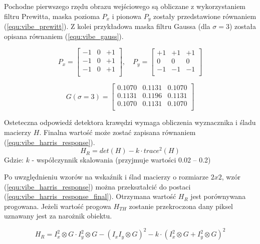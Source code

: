 Pochodne pierwszego rzędu obrazu wejściowego są obliczane z wykorzystaniem filtru Prewitta, maska pozioma $P_x$ i pionowa $P_y$ zostały przedstawione równaniem (\ref{equ:vibe_prewitt}). Z kolei przykładowa maska filtru Gaussa (dla $\sigma = 3$) została opisana równaniem (\ref{equ:vibe_gauss}).

    \begin{equation}
        P_x = \begin{bmatrix}
			    -1 & 0 & +1 \\
			    -1 & 0 & +1 \\
			    -1 & 0 & +1 \\
		    \end{bmatrix}
		,\quad 
		P_y= \begin{bmatrix}
			    +1 & +1 & +1 \\
			    0 & 0 & 0 \\
			    -1 & -1 & -1 \\
		    \end{bmatrix}
        \label{equ:vibe_prewitt}
    \end{equation}

    \begin{equation}
       G(\sigma=3) = \begin{bmatrix}
			   0.1070 & 0.1131 & 0.1070 \\
			   0.1131 & 0.1196 & 0.1131 \\
			   0.1070 & 0.1131 & 0.1070 \\
		    \end{bmatrix}
        \label{equ:vibe_gauss}
    \end{equation}


Osteteczna odpowiedź detektora krawędzi wymaga obliczenia wyznacznika i śladu macierzy $H$. Finalna wartość może zostać zapisana równaniem (\ref{equ:vibe_harris_response}).
    \begin{equation}
        H_R = det(H)-k \cdot trace^2(H)
        \label{equ:vibe_harris_response}
    \end{equation}
Gdzie: $k$ - współczynnik skalowania (przyjmuje wartości \num{0.02} -- \num{0.2})


Po uwzględnieniu wzorów na wskaźnik i ślad macierzy o rozmiarze $2x2$, wzór (\ref{equ:vibe_harris_response}) można przekształcić do postaci (\ref{equ:vibe_harris_response_final}). Otrzymana wartość $H_R$ jest porównywana progowana. Jeżeli wartość progowa $H_{TH}$ zostanie przekroczona dany piksel uznawany jest za narożnik obiektu.  

    \begin{equation}
        H_R = I_x^2 \otimes G \cdot I_y^2 \otimes G - (I_x I_y \otimes G)^2  - k \cdot (I_x^2 \otimes G + I_y^2 \otimes G)^2
        \label{equ:vibe_harris_response_final}
    \end{equation}

